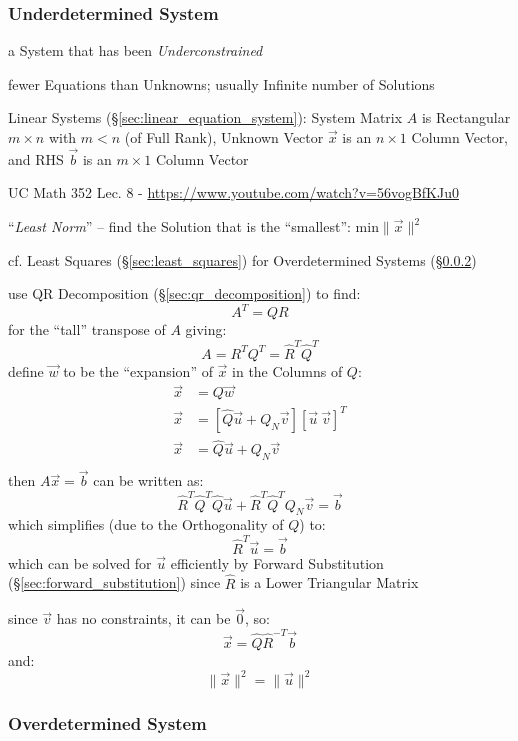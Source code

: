 \subsubsection{Underdetermined System}\label{sec:underdetermined_system}

a System that has been \emph{Underconstrained}

fewer Equations than Unknowns; usually Infinite number of Solutions

Linear Systems (\S\ref{sec:linear_equation_system}): System Matrix $A$ is
Rectangular $m \times n$ with $m < n$ (of Full Rank), Unknown Vector $\vec{x}$
is an $n \times 1$ Column Vector, and RHS $\vec{b}$ is an $m \times 1$ Column
Vector

UC Math 352 Lec. 8 - \url{https://www.youtube.com/watch?v=56vogBfKJu0}

``\emph{Least Norm}'' -- find the Solution that is the ``smallest'':
$\mathrm{min}\|\vec{x}\|^2$

cf. Least Squares (\S\ref{sec:least_squares}) for Overdetermined Systems
(\S\ref{sec:overdetermined_system})

use QR Decomposition (\S\ref{sec:qr_decomposition}) to find:
\[
  A^T = QR
\]
for the ``tall'' transpose of $A$ giving:
\[
  A = R^T Q^T = \hat{R}^T \hat{Q}^T
\]
define $\vec{w}$ to be the ``expansion'' of $\vec{x}$ in the Columns of $Q$:
\begin{align*}
  \vec{x} & = Q\vec{w} \\
  \vec{x} & = [\hat{Q}\vec{u} + Q_N\vec{v}] [\vec{u} \ \vec{v}]^T \\
  \vec{x} & = \hat{Q}\vec{u} + Q_N\vec{v} \\
\end{align*}
then $A\vec{x} = \vec{b}$ can be written as:
\[
  \hat{R}^T\hat{Q}^T\hat{Q}\vec{u} + \hat{R}^T\hat{Q}^TQ_N\vec{v} = \vec{b}
\]
which simplifies (due to the Orthogonality of $Q$) to:
\[
  \hat{R}^T\vec{u} = \vec{b}
\]
which can be solved for $\vec{u}$ efficiently by Forward Substitution
(\S\ref{sec:forward_substitution}) since $\hat{R}$ is a Lower Triangular Matrix

since $\vec{v}$ has no constraints, it can be $\vec{0}$, so:
\[
  \vec{x} = \hat{Q}\hat{R}^{-T}\vec{b}
\]
and:
\[
  \|\vec{x}\|^2 = \|\vec{u}\|^2
\]



\subsubsection{Overdetermined System}\label{sec:overdetermined_system}


